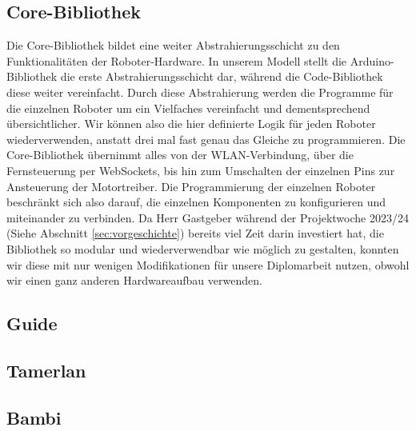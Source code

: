 \subsection{Core-Bibliothek}
\label{subec:robots_core}
Die Core-Bibliothek bildet eine weiter Abstrahierungsschicht zu den Funktionalitäten der Roboter-Hardware.
%
In unserem Modell stellt die Arduino-Bibliothek die erste Abstrahierungsschicht dar,
während die Code-Bibliothek diese weiter vereinfacht.
%
Durch diese Abstrahierung werden die Programme für die einzelnen Roboter um ein Vielfaches vereinfacht und dementsprechend übersichtlicher.
%
Wir können also die hier definierte Logik für jeden Roboter wiederverwenden,
anstatt drei mal fast genau das Gleiche zu programmieren.
%
Die Core-Bibliothek übernimmt alles von der WLAN-Verbindung,
über die Fernsteuerung per WebSockets,
bis hin zum Umschalten der einzelnen Pins zur Ansteuerung der Motortreiber.
%
Die Programmierung der einzelnen Roboter beschränkt sich also darauf,
die einzelnen Komponenten zu konfigurieren und miteinander zu verbinden.
%
Da Herr Gastgeber während der Projektwoche 2023/24 (Siehe Abschnitt \ref{sec:vorgeschichte}) bereits viel Zeit darin investiert hat,
die Bibliothek so modular und wiederverwendbar wie möglich zu gestalten,
konnten wir diese mit nur wenigen Modifikationen für unsere Diplomarbeit nutzen,
obwohl wir einen ganz anderen Hardwareaufbau verwenden.

\subsection{Guide}
\label{subsec:software_guide}

\subsection{Tamerlan}
\label{subsec:software_tamerlan}

\subsection{Bambi}
\label{subsec:software_bambi}